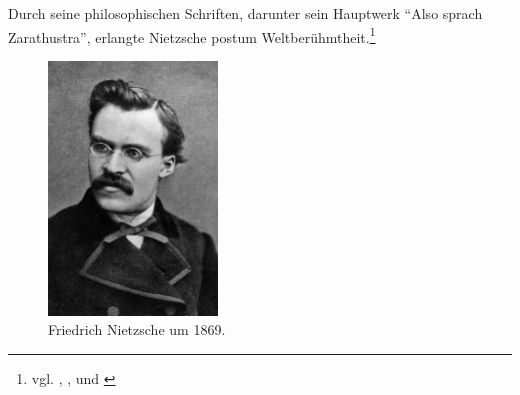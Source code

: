 Durch seine philosophischen Schriften, darunter sein Hauptwerk \enquote{Also sprach Zarathustra}, erlangte Nietzsche postum Weltberühmtheit.\footnote{vgl. \cite{Nietzsche1}, \cite{Nietzsche2}, \cite{Nietzsche3} und \cite{Nietzsche4}}

\begin{figure}[H]
\centering 
 \includegraphics[width=0.4\textwidth]{Bilder/kap3/nietzschePortrait} 
 \caption{Friedrich Nietzsche um 1869.\cite{WQ14}  \label{portraitNietzsche}}
\end{figure}




